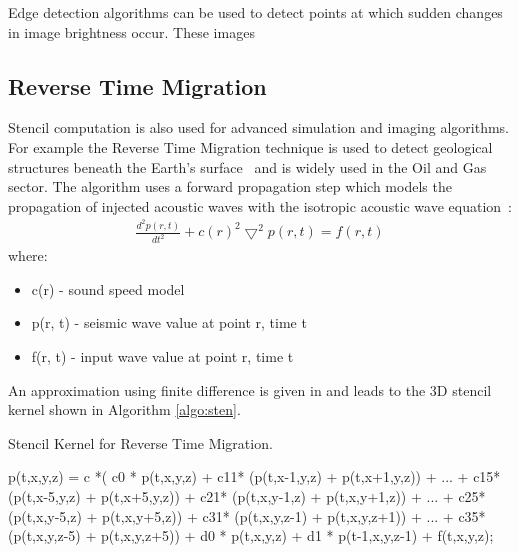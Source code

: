 
Edge detection algorithms can be used to detect points at which sudden
changes in image brightness occur. These images

\subsection{Reverse Time Migration}

Stencil computation is also used for advanced simulation and imaging
algorithms. For example the Reverse Time Migration technique is used
to detect geological structures beneath the Earth's
surface~\cite{baysal1983reverse} and is widely used in the Oil and Gas
sector. The algorithm uses a forward propagation step which models the
propagation of injected acoustic waves with the isotropic acoustic
wave equation~\cite{araya2011assessing}:
\begin{align}
  \frac{d^2p(r,t)}{dt^2} + {c(r)}^2\bigtriangledown^2p(r,t) = f(r,t)
\end{align}
where:
\begin{itemize}
\item c(r)    - sound speed model
\item p(r, t) - seismic wave value at point r, time t
\item f(r, t) - input wave value at point r, time t
\end{itemize}

An approximation using finite difference is given in
\cite{xinyu2013selfaware} and leads to the 3D stencil kernel
\cite{Xinyu:Qiwei:Luk:Qiang:Pell:2012} shown in Algorithm
\ref{algo:sten}.
\begin{algorithm}[!ht]\footnotesize
  \caption{Stencil Kernel for Reverse Time Migration.}
  \label{algo:sten}
  \begin{algorithmic}
    \State p(t,x,y,z) = c *(
    \State c0 * p(t,x,y,z) +
    \State c11* (p(t,x-1,y,z) + p(t,x+1,y,z)) + ... + c15*(p(t,x-5,y,z) + p(t,x+5,y,z)) +
    \State c21* (p(t,x,y-1,z) + p(t,x,y+1,z)) + ... + c25*(p(t,x,y-5,z) + p(t,x,y+5,z)) +
    \State c31* (p(t,x,y,z-1) + p(t,x,y,z+1)) + ... + c35*(p(t,x,y,z-5) + p(t,x,y,z+5)) +
    \State d0 *  p(t,x,y,z) + d1 * p(t-1,x,y,z-1) + f(t,x,y,z);
    \EndFor
    \EndFor
    \EndFor
    \EndFor
  \end{algorithmic}
\end{algorithm}


